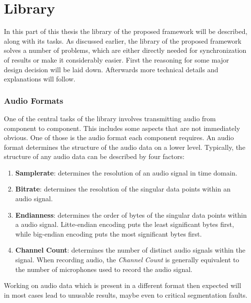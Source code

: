 


\section{Library}
\label{main:lib}
In this part of this thesis the library of the proposed framework will be described, along with its tasks.
As discussed earlier, the library of the proposed framework solves a number of problems, which are either directly needed for synchronization of results or make it considerably easier.
First the reasoning for some major design decision will be laid down.
Afterwards more technical details and explanations will follow.


\subsubsection{Audio Formats}
\label{main:lib:formats}
One of the central tasks of the library involves transmitting audio from component to component.
This includes some aspects that are not immediately obvious.
One of those is the audio format each component requires.
An audio format determines the structure of the audio data on a lower level.
Typically, the structure of any audio data can be described by four factors:
\begin{enumerate}
	\item \textbf{Samplerate}: determines the resolution of an audio signal in time domain.
	\item \textbf{Bitrate}: determines the resolution of the singular data points within an audio signal.
	\item \textbf{Endianness}: determines the order of bytes of the singular data points within a audio signal. Litte-endian encoding puts the least significant bytes first, while big-endian encoding puts the most significant bytes first. 
	\item \textbf{Channel Count}: determines the number of distinct audio signals within the signal. When recording audio, the \textit{Channel Count} is generally equivalent to the number of microphones used to record the audio signal.
\end{enumerate}
Working on audio data which is present in a different format then expected will in most cases lead to unusable results, maybe even to critical segmentation faults. 

